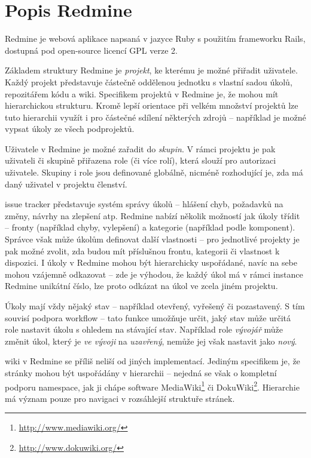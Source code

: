 \documentclass[thesis=B,czech]{FITthesis}[2012/05/02]
\begin{document}
\section{Popis Redmine}

Redmine je webová aplikace napsaná v jazyce Ruby s použitím frameworku
Rails, dostupná pod open-source licencí \gls{GPL} verze 2.

Základem struktury Redmine je \emph{projekt}, ke kterému je možné
přiřadit uživatele. Každý projekt představuje částečně oddělenou
jednotku s vlastní sadou úkolů, repozitářem kódu a \gls{wiki}.
Specifikem projektů v Redmine je, že mohou mít hierarchickou strukturu.
Kromě lepší orientace při velkém množství projektů lze tuto hierarchii
využít i pro částečné sdílení některých zdrojů -- například je možné
vypsat úkoly ze všech podprojektů.

Uživatele v Redmine je možné zařadit do \emph{skupin}. V rámci projektu
je pak uživateli či skupině přiřazena role (či více rolí), která slouží
pro autorizaci uživatele. Skupiny i role jsou definované globálně,
nicméně rozhodující je, zda má daný uživatel v projektu členství.

\Gls{issue tracker} představuje systém správy úkolů -- hlášení chyb,
požadavků na změny, návrhy na zlepšení atp. Redmine nabízí několik
možností jak úkoly třídit -- fronty (například chyby, vylepšení) a
kategorie (například podle komponent). Správce však může úkolům
definovat další vlastnosti -- pro jednotlivé projekty je pak možné
zvolit, zda budou mít příslušnou frontu, kategorii či vlastnost
k dispozici. I úkoly v Redmine mohou být hierarchicky uspořádané, navíc na
sebe mohou vzájemně odkazovat -- zde je výhodou, že každý úkol má
v rámci instance Redmine unikátní číslo, lze proto odkázat na úkol ve
zcela jiném projektu.

Úkoly mají vždy nějaký stav -- například otevřený, vyřešený či
pozastavený. S tím souvisí podpora \gls{workflow} -- tato funkce
umožňuje určit, jaký stav může určitá role nastavit úkolu s ohledem na
stávající stav. Například role \emph{vývojář} může změnit úkol, který je
\emph{ve vývoji} na \emph{uzavřený}, nemůže jej však nastavit jako
\emph{nový}.

\Gls{wiki} v Redmine se příliš neliší od jiných implementací. Jediným
specifikem je, že stránky mohou být uspořádány v hierarchii -- nejedná
se však o kompletní podporu \gls{namespace}, jak ji chápe software
MediaWiki\footnote{\url{http://www.mediawiki.org/}} či
DokuWiki\footnote{\url{http://www.dokuwiki.org/}}. Hierarchie má význam
pouze pro navigaci v rozsáhlejší struktuře stránek.
\end{document}
